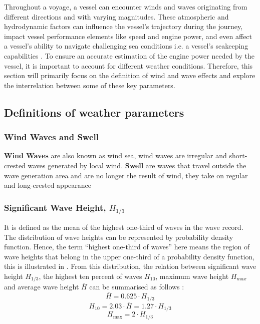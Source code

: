 Throughout a voyage, a vessel can encounter winds and waves originating from different directions and with varying magnitudes. These atmospheric and hydrodynamic factors can influence the vessel's trajectory during the journey, impact vessel performance elements like speed and engine power, and even affect a vessel's ability to navigate challenging sea conditions i.e. a vessel's seakeeping capabilities . To ensure an accurate estimation of the engine power needed by the vessel, it is important to account for different weather conditions. Therefore, this section will primarily focus on the definition of wind and wave effects and explore the interrelation between some of these key parameters.\\ 

\subsection{Definitions of weather parameters}\label{sec:weather_definition}

\subsubsection*{Wind Waves and Swell}

\textbf{Wind Waves} are also known as wind sea, wind waves are irregular and short-crested waves generated by local wind. \textbf{Swell} are waves that travel outside the wave generation area and are no longer the result of wind, they take on regular and long-crested appearance 

\subsubsection*{Significant Wave Height, $H_{1/3}$}

It is defined as the mean of the highest one-third of waves in the wave record. The distribution of wave heights can be represented by probability density function. Hence, the term ``highest one-third of waves'' here means the region of wave heights that belong in the upper one-third of a probability density function, this is illustrated in . From this distribution, the relation between significant wave height $H_{1/3}$, the highest ten percent of waves $H_{10}$, maximum wave height $H_{max}$ and average wave height $\overline{H}$ can be summarised as follows : 
\begin{equation}\label{eqn:Hsig_mean}
    \overline{H} = 0.625\cdot H_{1/3}
\end{equation}
\begin{equation}\label{eqn:Hsig_Hten}
    H_{10} = 2.03\cdot \overline{H} = 1.27\cdot H_{1/3} 
\end{equation}
\begin{equation}\label{eqn:Hsig_max}
    H_{\text{max}} = 2 \cdot H_{1/3} 
\end{equation} 

